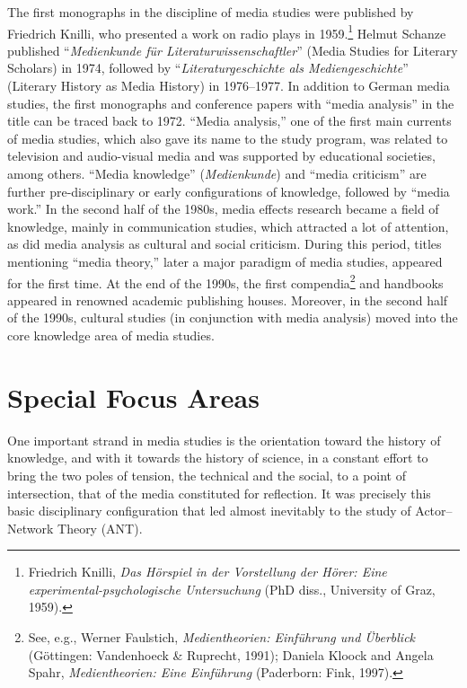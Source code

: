 \documentclass{tufte-handout}
\begin{document}
The first monographs in the discipline of media studies were published
by Friedrich Knilli, who presented a work on radio plays in
1959.\footnote{Friedrich Knilli, \emph{Das Hörspiel in der Vorstellung
  der Hörer: Eine experimental-psychologische Untersuchung} (PhD diss.,
  University of Graz, 1959).} Helmut Schanze published
``\emph{Medienkunde für Literaturwissenschaftler}'' (Media Studies for
Literary Scholars) in 1974, followed by ``\emph{Literaturgeschichte als
Mediengeschichte}'' (Literary History as Media History) in 1976--1977.
In addition to German media studies, the first monographs and conference
papers with ``media analysis'' in the title can be traced back to 1972.
``Media analysis,'' one of the first main currents of media studies,
which also gave its name to the study program, was related to television
and audio-visual media and was supported by educational societies, among
others. ``Media knowledge'' (\emph{Medienkunde}) and ``media criticism''
are further pre-disciplinary or early configurations of knowledge,
followed by ``media work.'' In the second half of the 1980s, media
effects research became a field of knowledge, mainly in communication
studies, which attracted a lot of attention, as did media analysis as
cultural and social criticism. During this period, titles mentioning
``media theory,'' later a major paradigm of media studies, appeared for
the first time. At the end of the 1990s, the first compendia\footnote{See,
  e.g., Werner Faulstich, \emph{Medientheorien: Einführung und
  Überblick} (Göttingen: Vandenhoeck \& Ruprecht, 1991); Daniela Kloock
  and Angela Spahr, \emph{Medientheorien: Eine Einführung} (Paderborn:
  Fink, 1997).} and handbooks appeared in renowned academic publishing
houses. Moreover, in the second half of the 1990s, cultural studies (in
conjunction with media analysis) moved into the core knowledge area of
media studies.

\hypertarget{special-focus-areas}{%
\section{Special Focus Areas}\label{special-focus-areas}}

One important strand in media studies is the orientation toward the
history of knowledge, and with it towards the history of science, in a
constant effort to bring the two poles of tension, the technical and the
social, to a point of intersection, that of the media constituted for
reflection. It was precisely this basic disciplinary configuration that
led almost inevitably to the study of Actor--Network Theory (ANT).
\end{document}
